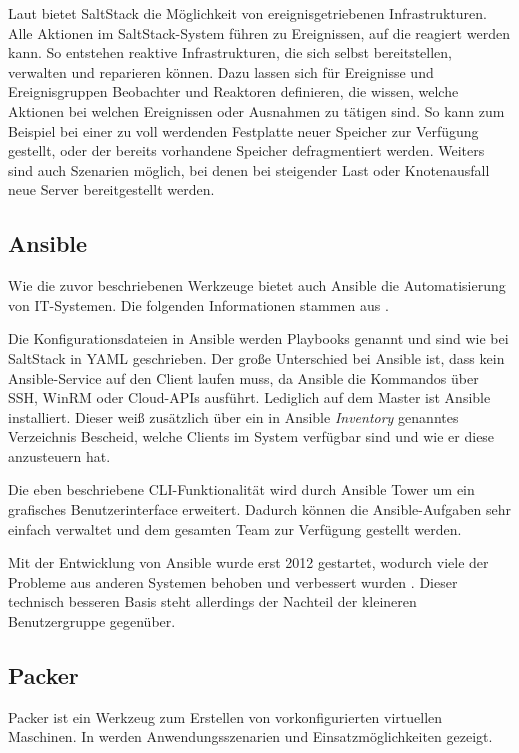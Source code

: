 Laut \autocite{SaltStack-Event:online} bietet SaltStack die Möglichkeit von ereignisgetriebenen Infrastrukturen.
Alle Aktionen im SaltStack-System führen zu Ereignissen, auf die reagiert werden kann.
So entstehen reaktive Infrastrukturen, die sich selbst bereitstellen, verwalten und reparieren können.
Dazu lassen sich für Ereignisse und Ereignisgruppen Beobachter und Reaktoren definieren, die wissen, welche Aktionen bei welchen Ereignissen oder Ausnahmen zu tätigen sind.
So kann zum Beispiel bei einer zu voll werdenden Festplatte neuer Speicher zur Verfügung gestellt, oder der bereits vorhandene Speicher defragmentiert werden.
Weiters sind auch Szenarien möglich, bei denen bei steigender Last oder Knotenausfall neue Server bereitgestellt werden.

\subsection{Ansible}
\label{sub:ansible}
Wie die zuvor beschriebenen Werkzeuge bietet auch Ansible die Automatisierung von IT-Systemen.
Die folgenden Informationen stammen aus \autocite{Ansible:online}.

Die Konfigurationsdateien in Ansible werden Playbooks genannt und sind wie bei SaltStack in YAML geschrieben.
Der große Unterschied bei Ansible ist, dass kein Ansible-Service auf den Client laufen muss, da Ansible die Kommandos über SSH, WinRM oder Cloud-APIs ausführt.
Lediglich auf dem Master ist Ansible installiert.
Dieser weiß zusätzlich über ein in Ansible \emph{Inventory} genanntes Verzeichnis Bescheid, welche Clients im System verfügbar sind und wie er diese anzusteuern hat.

Die eben beschriebene CLI-Funktionalität wird durch Ansible Tower um ein grafisches Benutzerinterface erweitert.
Dadurch können die Ansible-Aufgaben sehr einfach verwaltet und dem gesamten Team zur Verfügung gestellt werden.

Mit der Entwicklung von Ansible wurde erst 2012 gestartet, wodurch viele der Probleme aus anderen Systemen behoben und verbessert wurden \autocite{Wolff201604}. Dieser technisch besseren Basis steht allerdings der Nachteil der kleineren Benutzergruppe gegenüber.

\subsection{Packer}
\label{sub:packer}
Packer ist ein Werkzeug zum Erstellen von vorkonfigurierten virtuellen Maschinen.
In \autocite{Packer:online} werden Anwendungsszenarien und Einsatzmöglichkeiten gezeigt.

